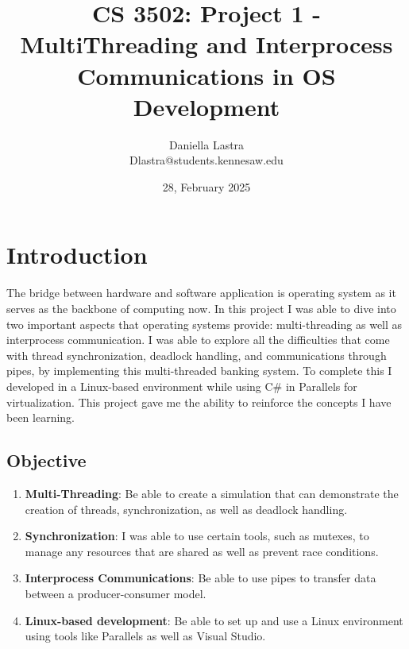 \documentclass{article}
\title{CS 3502: Project 1 - MultiThreading and Interprocess Communications in OS Development}
\author{Daniella Lastra \\ Dlastra@students.kennesaw.edu}
\date{28, February 2025}
\begin{document}
\maketitle

\section*{Introduction}

The bridge between hardware and software application is operating system as it serves as the backbone of computing now. In this project I was able to dive into two important aspects that operating systems provide: multi-threading as well as interprocess communication. I was able to explore all the difficulties that come with thread synchronization, deadlock handling, and communications through pipes, by implementing this multi-threaded banking system. To complete this I developed in a Linux-based environment while using C\# in Parallels for virtualization. This project gave me the ability to reinforce the concepts I have been learning. 

\subsection*{Objective}
\begin{enumerate}
    \item \textbf{Multi-Threading}: Be able to create a simulation that can demonstrate the creation of threads, synchronization, as well as deadlock handling.

    \item \textbf{Synchronization}: I was able to use certain tools, such as mutexes, to manage any resources that are shared as well as prevent race conditions.

    \item \textbf{Interprocess Communications}: Be able to use pipes to transfer data between a producer-consumer model.

    \item \textbf{Linux-based development}: Be able to set up and use a Linux environment using tools like Parallels as well as Visual Studio.
\end{enumerate}
\end{document}
